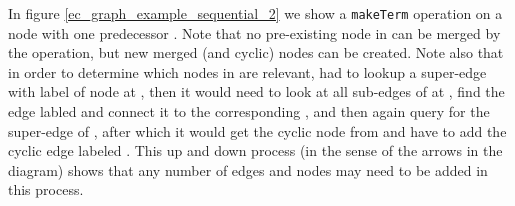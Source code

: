 In figure \ref{ec_graph_example_sequential_2} we show a \lstinline{makeTerm} operation on a node  with one predecessor .
Note that no pre-existing node in  can be merged by the operation, but new merged (and cyclic) nodes can be created.
Note also that in order to determine which nodes in  are relevant,  had to lookup
a super-edge with label  of node  at , then it would need to look at all sub-edges of  at ,
find the edge labled  and connect it to the corresponding , and then again query  for the super-edge  of ,
after which it would get the cyclic node from  and have to add the cyclic edge labeled .
This up and down process (in the sense of the arrows in the diagram) shows that any number of edges and nodes may need to be added in this process.

